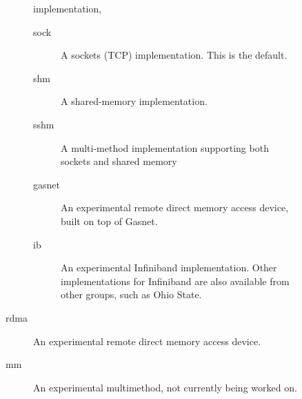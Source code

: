 \documentclass{article}
\begin{document}
\begin{description}
\begin{description}
\begin{description}
      implementation, 
      \begin{description}
      \item[sock]A sockets (TCP) implementation.  This is the default.
      \item[shm]A shared-memory implementation.
      \item[sshm]A multi-method implementation supporting both sockets
	and shared memory
      \item[gasnet]An experimental remote direct memory access device,
	built on top of Gasnet.
      \item[ib]An experimental Infiniband implementation.  Other
	implementations for Infiniband are also available from other
	groups, such as Ohio State.
      \end{description}
    \item[rdma]An experimental remote direct memory access device.
    \item[mm]An experimental multimethod, not currently being worked
      on.
    \end{description}


\end{description}
\end{description}
\end{document}

